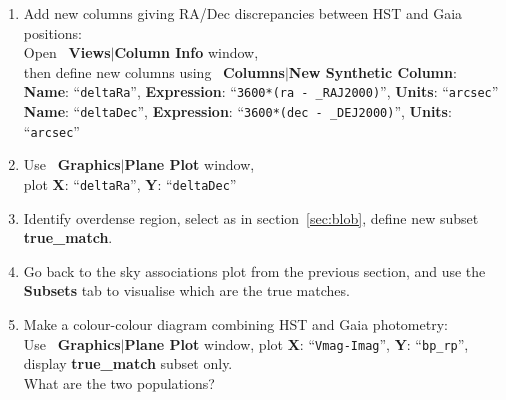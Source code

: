 \documentclass{article}
\newcommand{\buttimg}[1]
           {\mbox{\vtop{\vskip-2ex\hbox{\texttt{[image: \#1]}}}}}
\newcommand{\winfig}[2]
           {\vspace*{-0.5cm}
            \hspace*{0.5cm}\mbox{\vtop{\hbox{\texttt{[image: \#2]}}}}}
\newcommand{\lab}[1]{{\bf #1}}
\newcommand{\mb}[3]{\buttimg{#1}~\lab{#2}$\mid$\lab{#3}}
\newcommand{\entry}[2]{\lab{#1}: ``{\tt #2}''}
\begin{document}
\begin{minipage}[t]{11cm}
  \raggedright
  \begin{enumerate}
  \item Add new columns giving RA/Dec discrepancies between HST and Gaia
        positions: \\
        Open \mb{cols_button.png}{Views}{Column Info} window, \\
        then define new columns using
        \mb{plus_button.png}{Columns}{New Synthetic Column}: \\
        \entry{Name}{deltaRa}, \entry{Expression}{3600*(ra - \_RAJ2000)},
                               \entry{Units}{arcsec} \\
        \entry{Name}{deltaDec}, \entry{Expression}{3600*(dec - \_DEJ2000)},
                                \entry{Units}{arcsec}
  \item Use \mb{planeplot_button.png}{Graphics}{Plane Plot} window, \\
        plot \entry{X}{deltaRa}, \entry{Y}{deltaDec}
  \item Identify overdense region, select as in section~\ref{sec:blob},
        define new subset \lab{true\_match}.
  \item Go back to the sky associations plot from the previous section,
        and use the \lab{Subsets} tab to visualise which are the true matches.
  \item Make a colour-colour diagram combining HST and Gaia photometry: \\
        Use \mb{planeplot_button.png}{Graphics}{Plane Plot} window,
        plot \entry{X}{Vmag-Imag}, \entry{Y}{bp\_rp},
        display \lab{true\_match} subset only. \\
        What are the two populations?
  \end{enumerate}
\end{minipage}
\begin{minipage}[t]{8cm}
  \winfig{width=8cm}{n3_truematch.png}
\end{minipage}
\end{document}
